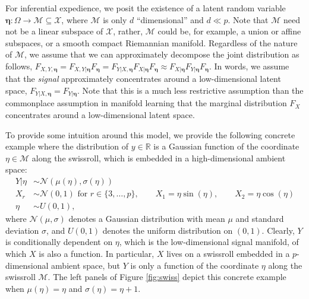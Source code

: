 \documentclass{article} %
\newcommand{\Real}{\mathbb{R}}
\providecommand{\mb}[1]{\boldsymbol{#1}}
\providecommand{\mc}[1]{\mathcal{#1}}
\newcommand{\from}{{\ensuremath{\colon}}}  %
\begin{document}
For inferential expedience, we  posit the existence of  a latent random variable $\mb{\eta} \from \Omega \to \mc{M} \subseteq \mc{X}$, where $\mc{M}$ is only $d$ ``dimensional'' and $d \ll p$.   
Note that $\mc{M}$ need not be a linear subspace of $\mc{X}$, rather, $\mc{M}$ could be, for example,  a union or affine subspaces, or a smooth compact Riemannian manifold.  Regardless of the nature of $\mc{M}$, we assume that we can approximately decompose the joint distribution as follows,  $F_{X,Y,\mb{\eta}}=F_{X,Y|\mb{\eta}}F_{\mb{\eta}} = F_{Y|X, \mb{\eta}} F_{X | \mb{\eta}} F_{\mb{\eta}} \approx F_{X|\mb{\eta}} F_{Y|\mb{\eta}} F_{\mb{\eta}}$.  In  words, we assume that the \emph{signal} approximately concentrates around a low-dimensional latent space, $F_{Y|X,\mb{\eta}}=F_{Y|\mb{\eta}}$.  Note that this is a much less restrictive assumption than the commonplace assumption in manifold learning that the marginal distribution $F_X$ concentrates around a low-dimensional latent space. 

To provide some intuition around this model, we provide the following concrete example where the distribution of $y \in \Real$ is a Gaussian function of the coordinate $\eta \in \mc{M}$ along the swissroll, which is embedded in a high-dimensional ambient space:
\begin{subequations} \label{eq:linear}
\begin{align}
	Y | \eta &\sim \mc{N}(\mu(\eta) ,\sigma(\eta)) \\
X_r &\sim \mc{N}(0,1) \text{ for } r \in \{3, \ldots, p\}, \qquad 	X_1 = \eta \sin (\eta), \qquad X_2 = \eta \cos (\eta) \\
	\eta  &\sim U(0,1), 
\end{align}
\end{subequations}
where $\mc{N}(\mu,\sigma)$ denotes a Gaussian distribution with mean $\mu$ and standard deviation $\sigma$, and $U(0,1)$ denotes the uniform distribution on $(0,1)$.
Clearly, $Y$ is conditionally dependent on ${\eta}$, which is the low-dimensional signal manifold, of which $X$ is also a function.  In particular, $X$ lives on a swissroll embedded in a $p$-dimensional ambient space, but $Y$ is only a function of the coordinate ${\eta}$ along the swissroll $\mc{M}$. The left panels of Figure \ref{fig:swiss} depict this concrete example when $\mu(\eta)=\eta$ and $\sigma(\eta)=\eta + 1$.
\end{document}
